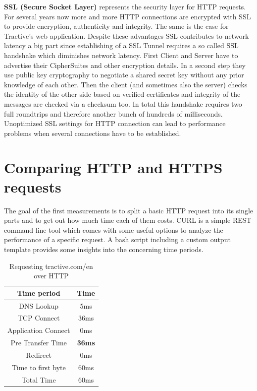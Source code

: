 \textbf{SSL (Secure Socket Layer)} represents the security layer for HTTP requests. For several years now more and more HTTP connections are encrypted with SSL to provide encryption, authenticity and integrity. The same is the case for Tractive's web application. Despite these advantages SSL contributes to network latency a big part since establishing of a SSL Tunnel requires a so called SSL handshake which diminishes network latency. First Client and Server have to advertise their CipherSuites and other encryption details. In a second step they use public key cryptography to negotiate a shared secret key without any prior knowledge of each other. Then the client (and sometimes also the server) checks the identity of the other side based on verified certificates and integrity of the messages are checked via a checksum too. In total this handshake requires two full roundtrips and therefore another bunch of hundreds of milliseconds. Unoptimized SSL settings for HTTP connection can lead to performance problems when several connections have to be established.

\section{Comparing HTTP and HTTPS requests}
The goal of the first measurements is to split a basic HTTP request into its single parts and to get out how much time each of them costs. 
CURL is a simple REST command line tool which comes with some useful options to analyze the performance of a specific request. A bash script including a custom output template provides some insights into the concerning time periods. 

\begin{table}[h]
\begin{center}
\begin{tabular}{| c | c |}
    \hline
    Time period & Time  \\ \hline
    DNS Lookup & 5ms  \\ \hline
    TCP Connect & 36ms \\ \hline
    Application Connect & 0ms \\ \hline 
    Pre Transfer Time & \textbf{36ms} \\ \hline
    Redirect & 0ms\\ \hline
    Time to first byte & 60ms \\ \hline
    Total Time & 60ms \\
    \hline
\end{tabular}
\caption{Requesting tractive.com/en over HTTP}
\end{center}
\end{table}

